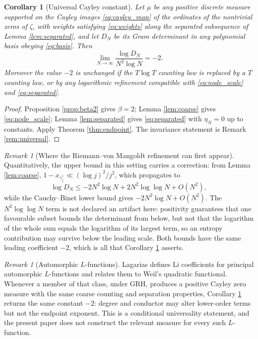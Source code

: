 \documentclass[11pt]{amsart}
\numberwithin{equation}{section}
\theoremstyle{plain}
\newtheorem{corollary}[theorem]{Corollary}
\theoremstyle{definition}
\theoremstyle{remark}
\newtheorem{remark}[theorem]{Remark}
\begin{document}
\begin{corollary}[Universal Cayley constant]
\label{cor:cayley}
Let $\mu$ be any positive discrete measure supported on the Cayley images \eqref{eq:cayley_map} of
the ordinates of the nontrivial zeros of $\zeta$, with weights satisfying \eqref{eq:weights} along
the separated subsequence of Lemma \ref{lem:separated}, and let $D_{N}$ be its Gram determinant in
any polynomial basis obeying \eqref{eq:basis}. Then
\begin{equation}
\boxed{\ \lim_{N\to\infty}\frac{\log D_{N}}{N^{2}\log N}=-2.\ }
\end{equation}
Moreover the value $-2$ is unchanged if the $T\log T$ counting law is replaced by a $T$ counting
law, or by any logarithmic refinement compatible with \eqref{eq:node_scale} and
\eqref{eq:separated}.
\end{corollary}

\begin{proof}
Proposition \ref{prop:beta2} gives $\beta=2$; Lemma \ref{lem:coarse} gives \eqref{eq:node_scale};
Lemma \ref{lem:separated} gives \eqref{eq:separated} with $\eta_{N}=0$ up to constants. Apply
Theorem \ref{thm:endpoint}. The invariance statement is Remark \ref{rem:universal}.
\end{proof}

\begin{remark}[Where the Riemann--von Mangoldt refinement can first appear]
Quantitatively, the upper bound in this setting carries a correction: from Lemma \ref{lem:coarse},
$1-x_{\gamma_{j}^{*}}\ll(\log j)^{2}/j^{2}$, which propagates to
\[
\log D_{N}\le-2N^{2}\log N+2N^{2}\log\log N+O(N^{2}),
\]
while the Cauchy--Binet lower bound gives $-2N^{2}\log N+O(N^{2})$. The $N^{2}\log\log N$ term is not
declared an artifact here: positivity guarantees that one favourable subset bounds the determinant
from below, but not that the logarithm of the whole sum equals the logarithm of its largest term, so
an entropy contribution may survive below the leading scale. Both bounds have the same leading
coefficient $-2$, which is all that Corollary \ref{cor:cayley} asserts.
\end{remark}

\begin{remark}[Automorphic $L$-functions]
Lagarias \cite{Lagarias2007} defines Li coefficients for principal automorphic $L$-functions and
relates them to Weil's quadratic functional. Whenever a member of that class, under GRH, produces a
positive Cayley zero measure with the same coarse counting and separation properties, Corollary
\ref{cor:cayley} returns the same constant $-2$: degree and conductor may alter lower-order terms
but not the endpoint exponent. This is a conditional universality statement, and the present paper
does not construct the relevant measure for every such $L$-function.
\end{remark}
\end{document}

